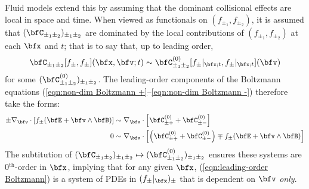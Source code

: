     \line

    Fluid models extend this by assuming that the dominant collisional effects are local in space and time.  When viewed as functionals on $(f_{\pm_{1}}, f_{\pm_{2}})$, it is assumed that $(\bfC_{\pm_{1}\pm_{2}})_{\pm_{1}\pm_{2}}$ are dominated by the local contributions of $(f_{\pm_{1}}, f_{\pm_{2}})$ at each $\bfx$ and $t$;  that is to say that, up to leading order,
    \begin{equation}
        \bfC_{\pm_{1}\pm_{2}}[f_{\pm}, f_{\pm}](\bfx, \bfv; t)  \sim  \bfC_{\pm_{1}\pm_{2}}^{(0)}[f_{\pm}|_{\bfx; t}, f_{\pm}|_{\bfx; t}](\bfv)
    \end{equation}
    for some $(\bfC_{\pm_{1}\pm_{2}}^{(0)})_{\pm_{1}\pm_{2}}$. The leading-order components of the Boltzmann equations (\ref{eqn:non-dim Boltzmann +}–\ref{eqn:non-dim Boltzmann -}) therefore take the forms:
    \begin{align}
        \pm \nabla_{\bfv}\cdot[f_{\pm}(\bfE + \bfv\wedge\bfB)]  &\sim  \nabla_{\bfv}\cdot\left[\bfC_{\pm+}^{(0)} + \bfC_{\pm-}^{(0)}\right]  \\
        0  &\sim  \nabla_{\bfv}\cdot\left[\left(\bfC_{\pm+}^{(0)} + \bfC_{\pm-}^{(0)}\right) \mp f_{\pm}(\bfE + \bfv\wedge\bfB)\right]  \label{eqn:leading-order Boltzmann}
    \end{align}
    The subtitution of $(\bfC_{\pm_{1}\pm_{2}})_{\pm_{1}\pm_{2}}  \mapsto  (\bfC_{\pm_{1}\pm_{2}}^{(0)})_{\pm_{1}\pm_{2}}$ ensures these systems are 0$^{\text{th}}$-order in $\bfx$, implying that for any given $\bfx$, (\ref{eqn:leading-order Boltzmann}) is a system of PDEs in $(f_{\pm}|_{\bfx})_{\pm}$ that is dependent on $\bfv$ \emph{only}.

    \line

